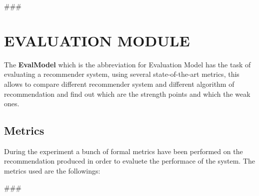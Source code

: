 
###


\section{EVALUATION MODULE}\label{sec:eva-module}
The \textbf{EvalModel} which is the abbreviation for Evaluation Model has the task of evaluating a recommender system,
using several state-of-the-art metrics, this allows to compare different recommender system and different algorithm of
recommendation and find out which are the strength points and which the weak ones.

\subsection{Metrics}\label{subsec:metrics}
During the experiment a bunch of formal metrics have been performed on the recommendation produced in order to evaluete the performace
of the system.
The metrics used are the followings:

\hfill\break

###

